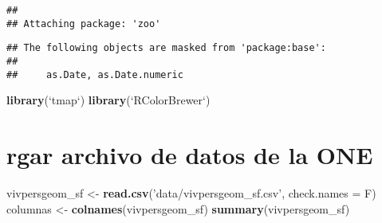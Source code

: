 \documentclass[11pt,]{article}
\newenvironment{Shaded}{\begin{snugshade}}{\end{snugshade}}
\newcommand{\KeywordTok}[1]{\textcolor[rgb]{0.13,0.29,0.53}{\textbf{#1}}}
\newcommand{\DataTypeTok}[1]{\textcolor[rgb]{0.13,0.29,0.53}{#1}}
\newcommand{\StringTok}[1]{\textcolor[rgb]{0.31,0.60,0.02}{#1}}
\newcommand{\NormalTok}[1]{#1}
\begin{document}
\begin{verbatim}
## 
## Attaching package: 'zoo'
\end{verbatim}

\begin{verbatim}
## The following objects are masked from 'package:base':
## 
##     as.Date, as.Date.numeric
\end{verbatim}

\begin{Shaded}
\begin{Highlighting}[]
\KeywordTok{library}\NormalTok{(}\StringTok{`}\DataTypeTok{tmap}\StringTok{`}\NormalTok{)}
\KeywordTok{library}\NormalTok{(}\StringTok{`}\DataTypeTok{RColorBrewer}\StringTok{`}\NormalTok{)}
\end{Highlighting}
\end{Shaded}

\section{rgar archivo de datos de la
ONE}\label{rgar-archivo-de-datos-de-la-one}

\begin{Shaded}
\begin{Highlighting}[]
\NormalTok{vivpersgeom_sf <-}\StringTok{ }\KeywordTok{read.csv}\NormalTok{(}\StringTok{'data/vivpersgeom_sf.csv'}\NormalTok{, }\DataTypeTok{check.names =}\NormalTok{ F)}
\NormalTok{columnas <-}\StringTok{ }\KeywordTok{colnames}\NormalTok{(vivpersgeom_sf)}
\KeywordTok{summary}\NormalTok{(vivpersgeom_sf)}
\end{Highlighting}
\end{Shaded}
\end{document}
